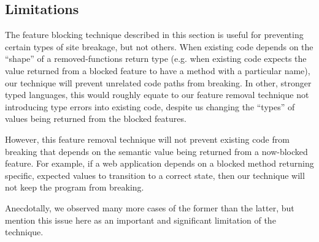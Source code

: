 \subsection{Limitations}
\label{cost-benefit:intercepting-js:limitations}
The feature blocking technique described in this section is useful for
preventing certain types of site breakage, but not others.  When existing
code depends on the ``shape'' of a removed-functions return type (e.g. when
existing code expects the value returned from a blocked feature to have a
method with a particular name), our technique will prevent unrelated
code paths from breaking.  In other, stronger typed languages, this would
roughly equate to our feature removal technique not introducing type errors
into existing code, despite us changing the ``types'' of values being returned
from the blocked features.

However, this feature removal technique will not prevent existing code from
breaking that depends on the semantic value being returned from a now-blocked
feature.  For example, if a web application depends on a blocked method
returning specific, expected values to transition to a correct state,
then our technique will not keep the program from breaking.

Anecdotally, we observed many more cases of the former than the latter,
but mention this issue here as an important and significant limitation of the
technique.
